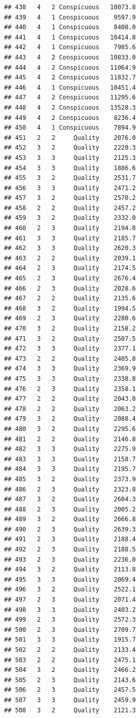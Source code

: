 \documentclass[12pt,]{krantz}
\theoremstyle{definition}
\theoremstyle{definition}
\theoremstyle{remark}
\begin{document}
\begin{verbatim}
## 438   4   2 Conspicuous   10073.8
## 439   4   1 Conspicuous    9597.9
## 440   4   1 Conspicuous    8408.0
## 441   4   1 Conspicuous   10414.8
## 442   4   1 Conspicuous    7985.6
## 443   4   2 Conspicuous   10833.0
## 444   4   2 Conspicuous   11064.9
## 445   4   2 Conspicuous   11832.7
## 446   4   1 Conspicuous   10451.4
## 447   4   2 Conspicuous   11295.6
## 448   4   2 Conspicuous   13528.3
## 449   4   2 Conspicuous    8236.4
## 450   4   1 Conspicuous    7894.9
## 451   2   2     Quality    2076.0
## 452   3   2     Quality    2220.3
## 453   3   3     Quality    2125.3
## 454   3   3     Quality    1886.6
## 455   3   2     Quality    2531.7
## 456   3   3     Quality    2471.2
## 457   3   2     Quality    2570.2
## 458   2   2     Quality    2457.2
## 459   3   2     Quality    2332.0
## 460   2   3     Quality    2194.8
## 461   3   3     Quality    2185.7
## 462   3   3     Quality    2620.3
## 463   2   2     Quality    2039.1
## 464   2   3     Quality    2174.5
## 465   2   3     Quality    2676.4
## 466   2   3     Quality    2028.6
## 467   2   2     Quality    2135.6
## 468   3   2     Quality    1994.5
## 469   2   3     Quality    2280.6
## 470   3   2     Quality    2158.2
## 471   3   2     Quality    2507.5
## 472   3   3     Quality    2377.1
## 473   2   2     Quality    2405.8
## 474   3   3     Quality    2369.9
## 475   3   3     Quality    2338.8
## 476   2   3     Quality    2358.1
## 477   2   2     Quality    2043.8
## 478   2   2     Quality    2063.2
## 479   3   2     Quality    2088.4
## 480   3   2     Quality    2295.6
## 481   2   2     Quality    2146.8
## 482   3   3     Quality    2275.9
## 483   3   3     Quality    2158.7
## 484   3   3     Quality    2195.7
## 485   3   2     Quality    2373.9
## 486   2   3     Quality    2323.8
## 487   3   2     Quality    2604.3
## 488   2   3     Quality    2005.2
## 489   3   2     Quality    2666.8
## 490   2   3     Quality    2639.3
## 491   2   3     Quality    2188.4
## 492   2   3     Quality    2188.5
## 493   2   3     Quality    2236.0
## 494   3   2     Quality    2113.8
## 495   3   3     Quality    2069.4
## 496   3   2     Quality    2522.1
## 497   2   3     Quality    2071.4
## 498   3   3     Quality    2403.2
## 499   2   3     Quality    2572.3
## 500   2   3     Quality    2709.7
## 501   3   3     Quality    1915.7
## 502   2   2     Quality    2133.4
## 503   2   2     Quality    2475.1
## 504   3   2     Quality    2466.2
## 505   2   3     Quality    2143.6
## 506   2   3     Quality    2457.5
## 507   3   3     Quality    2459.9
## 508   3   2     Quality    2121.3

\end{verbatim}
\end{document}
